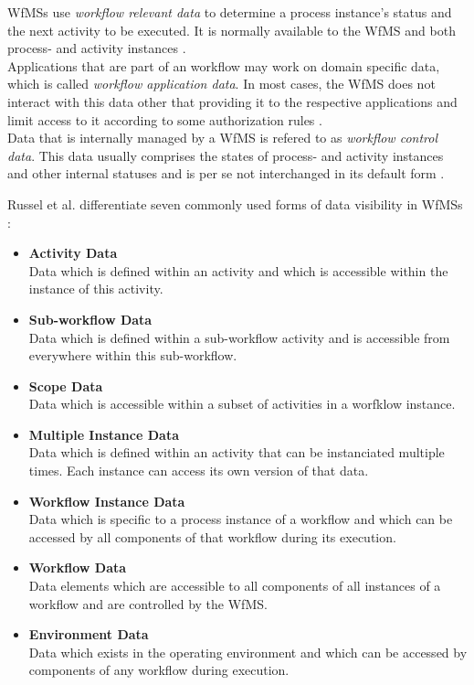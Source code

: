     \acp{WfMS} use \emph{workflow relevant data} to determine a process instance's status and the next activity to be executed. It is normally available to the \ac{WfMS} and both process- and activity instances \cite{Hollingsworth1995Wfmc}. \\
    Applications that are part of an workflow may work on domain specific data, which is called \emph{workflow application data}. In most cases, the \ac{WfMS} does not interact with this data other that providing it to the respective applications and limit access to it according to some authorization rules \cite{Hollingsworth1995Wfmc,Casati1999Specification}. \\
    Data that is internally managed by a \ac{WfMS} is refered to as \emph{workflow control data}. This data usually comprises the states of process- and activity instances and other internal statuses and is per se not interchanged in its default form \cite{Hollingsworth1995Wfmc,Casati1999Specification}.

    Russel et al. differentiate seven commonly used forms of data visibility in \acp{WfMS} \cite[p.~6-15]{Russell2005Workflow}:
    \begin{itemize}[nosep]
      \item \textbf{Activity Data} \hfill \\
        Data which is defined within an activity and which is accessible within the instance of this activity.
      \item \textbf{Sub-workflow Data} \hfill \\
        Data which is defined within a sub-workflow activity and is accessible from everywhere within this sub-workflow.
      \item \textbf{Scope Data} \hfill \\
        Data which is accessible within a subset of activities in a worfklow instance.
      \item \textbf{Multiple Instance Data} \hfill \\
        Data which is defined within an activity that can be instanciated multiple times. Each instance can access its own version of that data.
      \item \textbf{Workflow Instance Data} \hfill \\
        Data which is specific to a process instance of a workflow and which can be accessed by all components of that workflow during its execution.
      \item \textbf{Workflow Data} \hfill \\
        Data elements which are accessible to all components of all instances of a workflow and are controlled by the \ac{WfMS}.
      \item \textbf{Environment Data} \hfill \\
        Data which exists in the operating environment and which can be accessed by components of any workflow during execution.
    \end{itemize}

